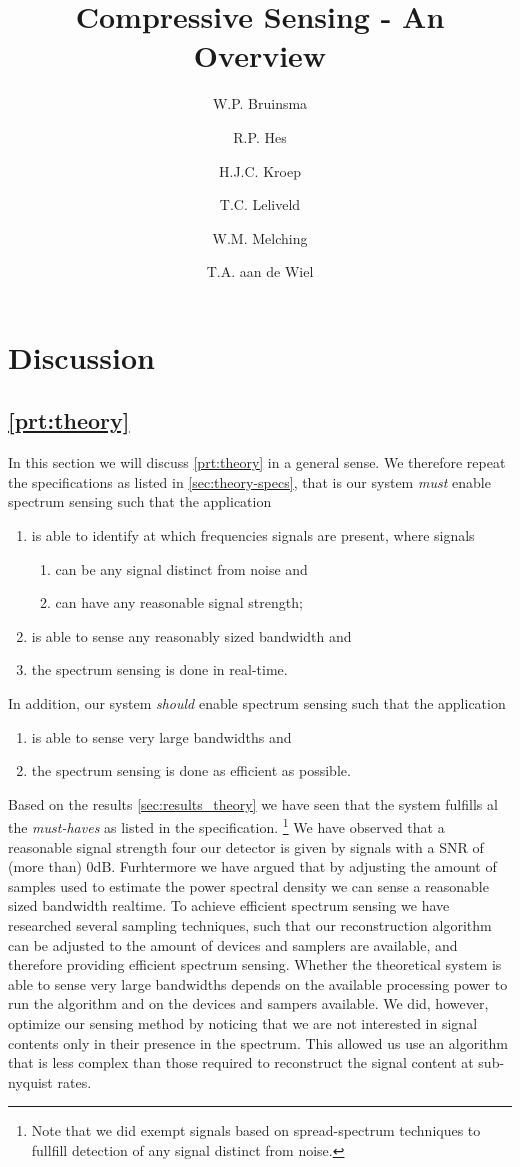 \documentclass[a4paper, openany, oneside]{memoir}
\title{Compressive Sensing - An Overview}
\author{W.P. Bruinsma \and R.P. Hes \and H.J.C. Kroep \and T.C. Leliveld \and W.M. Melching \and T.A. aan de Wiel}
\begin{document}
\chapter{Discussion}

\section{\cref{prt:theory}}
In this section we will discuss \cref{prt:theory} in a general sense. We therefore repeat the specifications as listed
in \cref{sec:theory-specs}, that is our system \emph{must} enable spectrum sensing such that the application
\begin{enumerate}
    \item is able to identify at which frequencies signals are present, where signals
    \begin{enumerate}
        \item can be any signal distinct from noise and
        \item can have any reasonable signal strength;
    \end{enumerate}
    \item is able to sense any reasonably sized bandwidth and
    \item the spectrum sensing is done in real-time.
\end{enumerate}
In addition, our system \emph{should} enable spectrum sensing such that the application
\begin{enumerate}
    \item is able to sense very large bandwidths and
    \item the spectrum sensing is done as efficient as possible.
\end{enumerate}

Based on the results \cref{sec:results_theory} we have seen that the system fulfills al the \emph{must-haves} as listed 
in the specification. \footnote{Note that we did exempt signals based on spread-spectrum techniques to fullfill detection of any signal distinct
from noise.} We have observed that a reasonable signal strength four our detector is given by signals with a SNR of (more than) 0dB. Furhtermore we have argued that by adjusting the amount of samples used to estimate the power spectral density we can sense a reasonable sized bandwidth realtime. To achieve efficient spectrum sensing we have researched several sampling techniques, such that our reconstruction algorithm can
be adjusted to the amount of devices and samplers are available, and therefore providing efficient spectrum sensing. Whether the theoretical system is able to sense very large bandwidths depends on the available processing power to run the algorithm and on the devices and sampers available. We did, however, optimize our sensing method by noticing that we are not interested in signal contents only in their presence in the spectrum. This allowed us use an algorithm that is less complex than those required to reconstruct the signal content at sub-nyquist rates.
\end{document}
